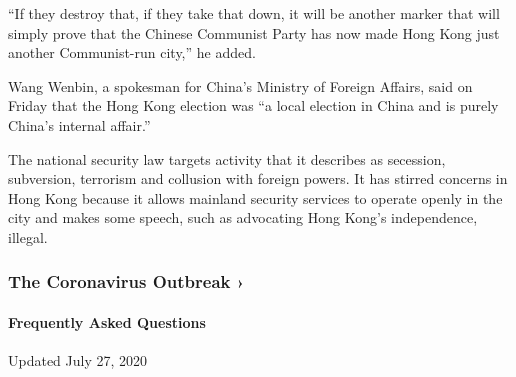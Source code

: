 ``If they destroy that, if they take that down, it will be another
marker that will simply prove that the Chinese Communist Party has now
made Hong Kong just another Communist-run city,'' he added.

Wang Wenbin, a spokesman for China's Ministry of Foreign Affairs, said
on Friday that the Hong Kong election was ``a local election in China
and is purely China's internal affair.''

The national security law targets activity that it describes as
secession, subversion, terrorism and collusion with foreign powers. It
has stirred concerns in Hong Kong because it allows mainland security
services to operate openly in the city and makes some speech, such as
advocating Hong Kong's independence, illegal.

\href{https://www.nytimes3xbfgragh.onion/news-event/coronavirus?action=click\&pgtype=Article\&state=default\&region=MAIN_CONTENT_3\&context=storylines_faq}{}

\hypertarget{the-coronavirus-outbreak-}{%
\subsubsection{The Coronavirus Outbreak
›}\label{the-coronavirus-outbreak-}}

\hypertarget{frequently-asked-questions}{%
\paragraph{Frequently Asked
Questions}\label{frequently-asked-questions}}

Updated July 27, 2020


